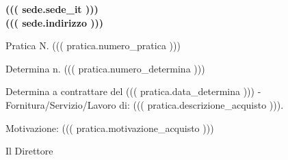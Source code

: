 \documentclass[a4paper,12pt]{letter}
\begin{document}
\vspace{-2.5cm}
\begin{center}
\small \bf
((( sede.sede_it ))) \\
((( sede.indirizzo )))
\end{center}

\thispagestyle{empty}
\vspace{1cm}

{\small Pratica N. ((( pratica.numero_pratica ))) }
\vspace{1cm}

\begin{flushright}

Determina n. ((( pratica.numero_determina )))
\end{flushright}

Determina a contrattare del ((( pratica.data_determina ))) - Fornitura/Servizio/Lavoro di: ((( pratica.descrizione_acquisto ))).

Motivazione: ((( pratica.motivazione_acquisto )))
\vspace{0.5cm}

\begin{center}
Il Direttore
\end{center}

\vspace{0.5 cm}
\end{document}
